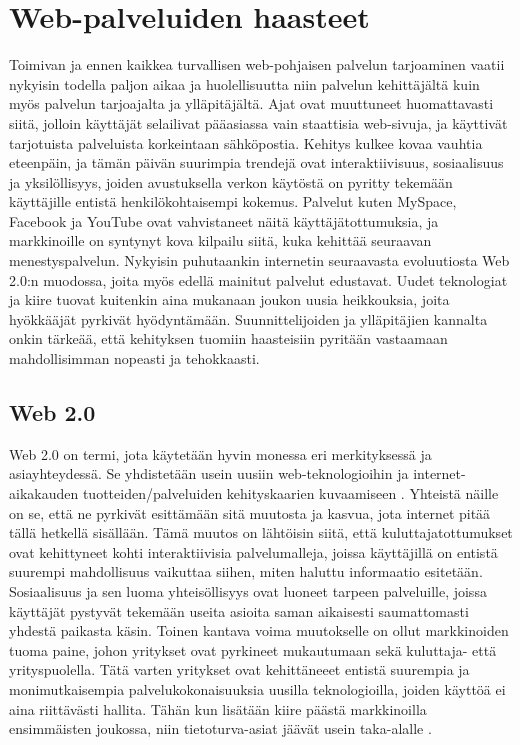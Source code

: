 
\chapter{Web-palveluiden haasteet}

Toimivan ja ennen kaikkea turvallisen web-pohjaisen palvelun tarjoaminen vaatii
nykyisin todella paljon aikaa ja huolellisuutta niin palvelun kehittäjältä kuin myös
palvelun tarjoajalta ja ylläpitäjältä. Ajat ovat muuttuneet huomattavasti siitä,
jolloin käyttäjät selailivat pääasiassa vain staattisia web-sivuja, ja käyttivät tarjotuista
palveluista korkeintaan sähköpostia. Kehitys kulkee kovaa vauhtia eteenpäin, ja
tämän päivän suurimpia trendejä ovat interaktiivisuus, sosiaalisuus ja yksilöllisyys, 
joiden avustuksella verkon käytöstä on pyritty tekemään
käyttäjille entistä henkilökohtaisempi kokemus. Palvelut kuten MySpace,
Facebook ja YouTube ovat vahvistaneet näitä käyttäjätottumuksia, ja
markkinoille on syntynyt kova kilpailu siitä, kuka kehittää seuraavan
menestyspalvelun. Nykyisin puhutaankin internetin seuraavasta evoluutiosta Web 2.0:n 
muodossa, joita myös edellä mainitut palvelut edustavat. Uudet teknologiat ja
kiire tuovat kuitenkin aina mukanaan joukon uusia heikkouksia, joita hyökkääjät
pyrkivät hyödyntämään. Suunnittelijoiden ja ylläpitäjien kannalta onkin tärkeää, että 
kehityksen tuomiin haasteisiin pyritään vastaamaan mahdollisimman nopeasti ja tehokkaasti.

\section{Web 2.0}

Web 2.0 on termi, jota käytetään hyvin monessa eri merkityksessä ja
asiayhteydessä. Se yhdistetään usein uusiin web-teknologioihin ja internet-
aikakauden tuotteiden/palveluiden kehityskaarien kuvaamiseen \cite{WEB2}. Yhteistä näille
on se, että ne pyrkivät esittämään sitä muutosta ja kasvua, jota internet pitää tällä
hetkellä sisällään. Tämä muutos on lähtöisin siitä, että kuluttajatottumukset
ovat kehittyneet kohti interaktiivisia palvelumalleja, joissa käyttäjillä on
entistä suurempi mahdollisuus vaikuttaa siihen, miten haluttu informaatio esitetään.
Sosiaalisuus ja sen luoma yhteisöllisyys ovat luoneet tarpeen palveluille,
joissa käyttäjät pystyvät tekemään useita asioita saman aikaisesti saumattomasti
yhdestä paikasta käsin. Toinen kantava voima  muutokselle on ollut markkinoiden
tuoma paine, johon yritykset ovat pyrkineet mukautumaan sekä kuluttaja- että yrityspuolella. 
Tätä varten yritykset ovat kehittäneeet entistä suurempia ja 
monimutkaisempia palvelukokonaisuuksia uusilla teknologioilla, joiden käyttöä ei aina riittävästi hallita. 
Tähän kun lisätään kiire päästä markkinoilla ensimmäisten
joukossa, niin tietoturva-asiat jäävät usein taka-alalle \cite{WEB2b}.

